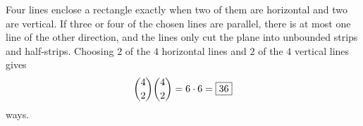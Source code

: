 Four lines enclose a rectangle exactly when two of them are horizontal and two are vertical. If three or four of the chosen lines are parallel, there is at most one line of the other direction, and the lines only cut the plane into unbounded strips and half-strips. Choosing $2$ of the $4$ horizontal lines and $2$ of the $4$ vertical lines gives
\[
\dbinom42\dbinom42=6\cdot6=\boxed{36}
\]
ways.
